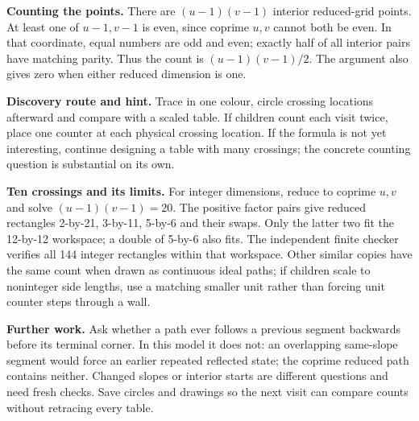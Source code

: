 \documentclass[11pt]{article}
\newcommand{\labelled}[2]{\textbf{#1} #2\par}
\begin{document}
\labelled{Counting the points.}{There are $(u-1)(v-1)$ interior reduced-grid points. At least one of $u-1,v-1$ is even, since coprime $u,v$ cannot both be even. In that coordinate, equal numbers are odd and even; exactly half of all interior pairs have matching parity. Thus the count is $(u-1)(v-1)/2$. The argument also gives zero when either reduced dimension is one.}
\labelled{Discovery route and hint.}{Trace in one colour, circle crossing locations afterward and compare with a scaled table. If children count each visit twice, place one counter at each physical crossing location. If the formula is not yet interesting, continue designing a table with many crossings; the concrete counting question is substantial on its own.}
\labelled{Ten crossings and its limits.}{For integer dimensions, reduce to coprime $u,v$ and solve $(u-1)(v-1)=20$. The positive factor pairs give reduced rectangles 2-by-21, 3-by-11, 5-by-6 and their swaps. Only the latter two fit the 12-by-12 workspace; a double of 5-by-6 also fits. The independent finite checker verifies all 144 integer rectangles within that workspace. Other similar copies have the same count when drawn as continuous ideal paths; if children scale to noninteger side lengths, use a matching smaller unit rather than forcing unit counter steps through a wall.}
\labelled{Further work.}{Ask whether a path ever follows a previous segment backwards before its terminal corner. In this model it does not: an overlapping same-slope segment would force an earlier repeated reflected state; the coprime reduced path contains neither. Changed slopes or interior starts are different questions and need fresh checks. Save circles and drawings so the next visit can compare counts without retracing every table.}
\end{document}
